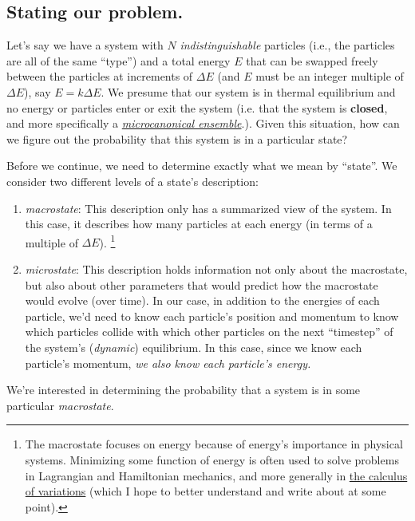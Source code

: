 \documentclass[letterpaper,12pt]{report}
\providecommand{\tightlist}{%
  \setlength{\itemsep}{0pt}\setlength{\parskip}{0pt}}
\begin{document}
\subsection{Stating our problem.}

Let's say we have a system with \(N\) \emph{indistinguishable}
particles 
(i.e., the particles are all of the same ``type'') 
and a total energy
\(E\) that can be swapped freely between the particles at increments of \(\Delta E\) (and
\(E\) must be an integer multiple of \(\Delta E\)), say
\(E = k\Delta E\). We presume that our system is in 
thermal equilibrium and no energy or particles enter or exit the system (i.e. that the system
is \textbf{closed}, and more specifically a
\emph{\href{https://en.wikipedia.org/wiki/Microcanonical_ensemble}{microcanonical ensemble}}.).
Given this situation, how can we figure out the probability
that this system is in a particular state?


Before we continue, we need to determine exactly what we mean by ``state''. We consider
two different levels of a state's description:
\begin{enumerate}
  \tightlist
  \item
    \emph{macrostate}: This description only has a summarized view of the system. In this case,
      it describes how many particles at each energy (in terms of a multiple of \(\Delta E\)).
      \footnote{
      The macrostate focuses on energy because of energy's importance in physical systems.
      Minimizing some function of energy is often used to solve problems in Lagrangian and
      Hamiltonian mechanics, and more generally in
      \href{https://en.wikipedia.org/wiki/Calculus_of_variations}{the calculus of variations}
      (which I hope to better understand and write about at some point).
      }
  \item 
    \emph{microstate}: This description holds information not only about the macrostate,
      but also about other parameters that would predict how the macrostate would evolve
      (over time). In our case, in addition to the
      energies of each particle, 
      we'd need to know each particle's position and momentum to know which particles collide
      with which other particles on the next ``timestep'' of the system's (\emph{dynamic})
      equilibrium. In this case, since we know each particle's momentum, 
      \emph{we also know each particle's energy.}
\end{enumerate}

We're interested in determining the probability that a system is in some particular
\emph{macrostate}.
\end{document}
